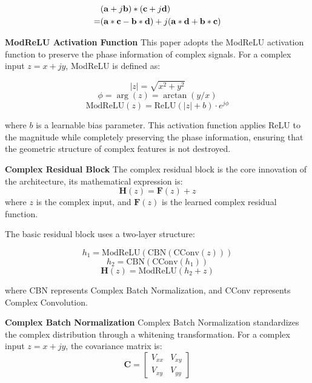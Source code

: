 \documentclass[conference]{IEEEtran}
\begin{document}
\begin{align}
&(\mathbf{a} + j\mathbf{b}) * (\mathbf{c} + j\mathbf{d}) \notag \\
= &(\mathbf{a} * \mathbf{c} - \mathbf{b} * \mathbf{d}) 
+ j(\mathbf{a} * \mathbf{d} + \mathbf{b} * \mathbf{c})
\end{align}

\textbf{ModReLU Activation Function} This paper adopts the ModReLU activation function to preserve the phase information of complex signals. For a complex input $z = x + jy$, ModReLU is defined as:

\begin{equation}
|z| = \sqrt{x^2 + y^2}
\end{equation}
\begin{equation}
\phi = \arg(z) = \arctan(y/x)
\end{equation}
\begin{equation}
\text{ModReLU}(z) = \text{ReLU}(|z| + b) \cdot e^{j\phi}
\end{equation}

where $b$ is a learnable bias parameter. This activation function applies ReLU to the magnitude while completely preserving the phase information, ensuring that the geometric structure of complex features is not destroyed.

\textbf{Complex Residual Block} The complex residual block is the core innovation of the architecture, its mathematical expression is:
\begin{equation}
\mathbf{H}(z) = \mathbf{F}(z) + z
\end{equation}
where $z$ is the complex input, and $\mathbf{F}(z)$ is the learned complex residual function.

The basic residual block uses a two-layer structure:

\begin{equation}
h_1 = \text{ModReLU}(\text{CBN}(\text{CConv}(z)))
\end{equation}
\begin{equation}
h_2 = \text{CBN}(\text{CConv}(h_1))
\end{equation}
\begin{equation}
\mathbf{H}(z) = \text{ModReLU}(h_2 + z)
\end{equation}

where CBN represents Complex Batch Normalization, and CConv represents Complex Convolution.

\textbf{Complex Batch Normalization} Complex Batch Normalization standardizes the complex distribution through a whitening transformation. For a complex input $z = x + jy$, the covariance matrix is:
\begin{equation}
\mathbf{C} = \begin{bmatrix} V_{xx} & V_{xy} \\ V_{xy} & V_{yy} \end{bmatrix}
\end{equation}
\end{document}
